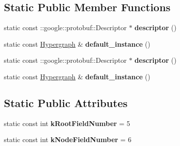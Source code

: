 \subsection*{Static Public Member Functions}
\begin{DoxyCompactItemize}
\item 
\hypertarget{classHypergraph_aa234b49896c08a611c8088504cd0db60}{
static const ::google::protobuf::Descriptor $\ast$ {\bfseries descriptor} ()}
\label{classHypergraph_aa234b49896c08a611c8088504cd0db60}

\item 
\hypertarget{classHypergraph_a370708c0a37cbf8e847a34880519e872}{
static const \hyperlink{classHypergraph}{Hypergraph} \& {\bfseries default\_\-instance} ()}
\label{classHypergraph_a370708c0a37cbf8e847a34880519e872}

\item 
\hypertarget{classHypergraph_ab26f2bbcbb6ce99b3bbb1a210cdfcd38}{
static const ::google::protobuf::Descriptor $\ast$ {\bfseries descriptor} ()}
\label{classHypergraph_ab26f2bbcbb6ce99b3bbb1a210cdfcd38}

\item 
\hypertarget{classHypergraph_ad44f1245d88fb5a3c542f7c1d7081390}{
static const \hyperlink{classHypergraph}{Hypergraph} \& {\bfseries default\_\-instance} ()}
\label{classHypergraph_ad44f1245d88fb5a3c542f7c1d7081390}

\end{DoxyCompactItemize}
\subsection*{Static Public Attributes}
\begin{DoxyCompactItemize}
\item 
\hypertarget{classHypergraph_a2e8f834b9b2c946dc1c7bdaded177a2b}{
static const int {\bfseries kRootFieldNumber} = 5}
\label{classHypergraph_a2e8f834b9b2c946dc1c7bdaded177a2b}

\item 
\hypertarget{classHypergraph_a2d9dea1733d42814b38878cd7e93195f}{
static const int {\bfseries kNodeFieldNumber} = 6}
\label{classHypergraph_a2d9dea1733d42814b38878cd7e93195f}

\end{DoxyCompactItemize}
